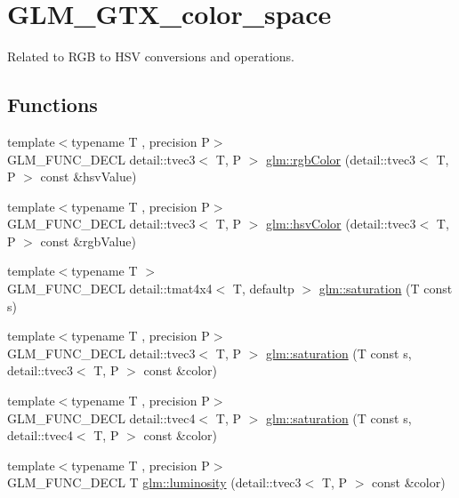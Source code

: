 \hypertarget{group__gtx__color__space}{}\section{G\+L\+M\+\_\+\+G\+T\+X\+\_\+color\+\_\+space}
\label{group__gtx__color__space}


Related to R\+GB to H\+SV conversions and operations.  


\subsection*{Functions}
\begin{DoxyCompactItemize}
\item 
{\footnotesize template$<$typename T , precision P$>$ }\\G\+L\+M\+\_\+\+F\+U\+N\+C\+\_\+\+D\+E\+CL detail\+::tvec3$<$ T, P $>$ \hyperlink{group__gtx__color__space_gafe29cc37c2675aee66c9f9ae3e5e7294}{glm\+::rgb\+Color} (detail\+::tvec3$<$ T, P $>$ const \&hsv\+Value)
\item 
{\footnotesize template$<$typename T , precision P$>$ }\\G\+L\+M\+\_\+\+F\+U\+N\+C\+\_\+\+D\+E\+CL detail\+::tvec3$<$ T, P $>$ \hyperlink{group__gtx__color__space_ga9d3d99c06af10403d317dec0cb655090}{glm\+::hsv\+Color} (detail\+::tvec3$<$ T, P $>$ const \&rgb\+Value)
\item 
{\footnotesize template$<$typename T $>$ }\\G\+L\+M\+\_\+\+F\+U\+N\+C\+\_\+\+D\+E\+CL detail\+::tmat4x4$<$ T, defaultp $>$ \hyperlink{group__gtx__color__space_ga444bcc8582eaa894acf405762ba2a5ff}{glm\+::saturation} (T const s)
\item 
{\footnotesize template$<$typename T , precision P$>$ }\\G\+L\+M\+\_\+\+F\+U\+N\+C\+\_\+\+D\+E\+CL detail\+::tvec3$<$ T, P $>$ \hyperlink{group__gtx__color__space_ga1a6fe89b5effcc718b5f49de5bb50fad}{glm\+::saturation} (T const s, detail\+::tvec3$<$ T, P $>$ const \&color)
\item 
{\footnotesize template$<$typename T , precision P$>$ }\\G\+L\+M\+\_\+\+F\+U\+N\+C\+\_\+\+D\+E\+CL detail\+::tvec4$<$ T, P $>$ \hyperlink{group__gtx__color__space_ga42cc34c45ab66e010c629106952c8bdd}{glm\+::saturation} (T const s, detail\+::tvec4$<$ T, P $>$ const \&color)
\item 
{\footnotesize template$<$typename T , precision P$>$ }\\G\+L\+M\+\_\+\+F\+U\+N\+C\+\_\+\+D\+E\+CL T \hyperlink{group__gtx__color__space_ga3fb6710bbbf4f3e2303b06946e9cf00c}{glm\+::luminosity} (detail\+::tvec3$<$ T, P $>$ const \&color)
\end{DoxyCompactItemize}


